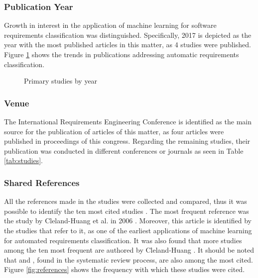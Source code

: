 \documentclass[conference]{IEEEtran}
\begin{document}
\subsubsection{Publication Year}

Growth in interest in the application of machine learning for software requirements classification was distinguished. Specifically, 2017 is depicted as the year with the most published articles in this matter, as 4 studies were published. Figure \ref{fig:publication_years} shows the trends in publications addressing automatic requirements classification.

\begin{figure}[!htbp]
    \caption{\label{fig:publication_years}Primary studies by year}
\end{figure}

\subsubsection{Venue}

The International Requirements Engineering Conference is identified as the main source for the publication of articles of this matter, as four articles were published in proceedings of this congress. Regarding the remaining studies, their publication was conducted in different conferences or journals as seen in Table \ref{tab:studies}.

\subsubsection{Shared References}

All the references made in the studies were collected and compared, thus it was possible to identify the ten most cited studies \cite{Cleland-Huang2006, Cleland-Huang2007, Slankas2013, Glinz2007, Zhang2011AnES, 8049171, 8049172, Knauss2012, Maalej2016, Yang2015}. The most frequent reference was the study by Cleland-Huang et al. in 2006 \cite{Cleland-Huang2006}. Moreover, this article is identified by the studies that refer to it, as one of the earliest applications of machine learning for automated requirements classification. It was also found that more studies among the ten most frequent are authored by Cleland-Huang \cite{Cleland-Huang2007, Knauss2012}. It should be noted that \cite{8049172} and \cite{8049171}, found in the systematic review process, are also among the most cited. Figure \ref{fig:references} shows the frequency with which these studies were cited.
\end{document}
